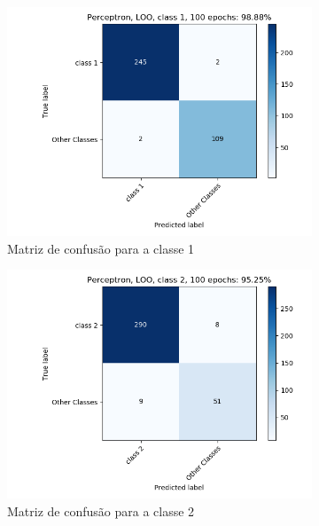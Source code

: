 \documentclass[paper=a4, fontsize=11pt]{scrartcl}
\numberwithin{equation}{section}		%
\numberwithin{figure}{section}			%
\numberwithin{table}{section}				%
\begin{document}
	\begin{figure}[h!]
		\begin{subfigure}{.5\textwidth}
			\centering
			\includegraphics[width=\linewidth]{img/q3_fig_loo_classe1.png}
			\caption{Matriz de confusão para a classe 1}
			\label{fig:q1grau2}
		\end{subfigure}%
		\begin{subfigure}{.5\textwidth}
			\centering
			\includegraphics[width=\linewidth]{img/q3_fig_loo_classe2.png}
			\caption{Matriz de confusão para a classe 2}
			\label{fig:q1_grau3}
		\end{subfigure}
		\begin{subfigure}{.5\textwidth}
			\centering

\end{subfigure}
\end{figure}
\end{document}

